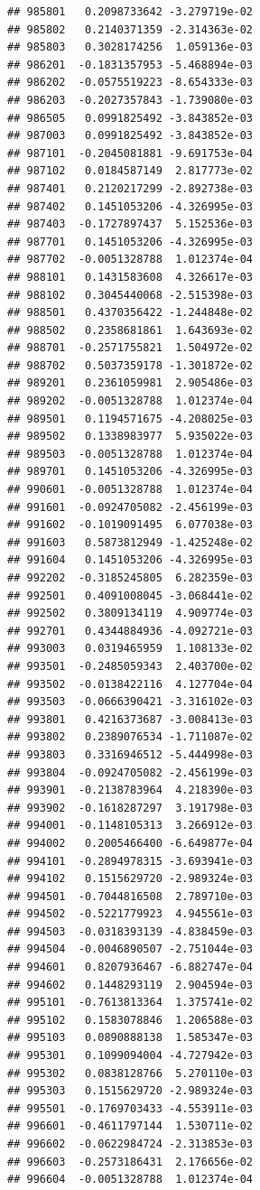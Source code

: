 \begin{frame}[fragile]
\begin{verbatim}
## 985801   0.2098733642 -3.279719e-02
## 985802   0.2140371359 -2.314363e-02
## 985803   0.3028174256  1.059136e-03
## 986201  -0.1831357953 -5.468894e-03
## 986202  -0.0575519223 -8.654333e-03
## 986203  -0.2027357843 -1.739080e-03
## 986505   0.0991825492 -3.843852e-03
## 987003   0.0991825492 -3.843852e-03
## 987101  -0.2045081881 -9.691753e-04
## 987102   0.0184587149  2.817773e-02
## 987401   0.2120217299 -2.892738e-03
## 987402   0.1451053206 -4.326995e-03
## 987403  -0.1727897437  5.152536e-03
## 987701   0.1451053206 -4.326995e-03
## 987702  -0.0051328788  1.012374e-04
## 988101   0.1431583608  4.326617e-03
## 988102   0.3045440068 -2.515398e-03
## 988501   0.4370356422 -1.244848e-02
## 988502   0.2358681861  1.643693e-02
## 988701  -0.2571755821  1.504972e-02
## 988702   0.5037359178 -1.301872e-02
## 989201   0.2361059981  2.905486e-03
## 989202  -0.0051328788  1.012374e-04
## 989501   0.1194571675 -4.208025e-03
## 989502   0.1338983977  5.935022e-03
## 989503  -0.0051328788  1.012374e-04
## 989701   0.1451053206 -4.326995e-03
## 990601  -0.0051328788  1.012374e-04
## 991601  -0.0924705082 -2.456199e-03
## 991602  -0.1019091495  6.077038e-03
## 991603   0.5873812949 -1.425248e-02
## 991604   0.1451053206 -4.326995e-03
## 992202  -0.3185245805  6.282359e-03
## 992501   0.4091008045 -3.068441e-02
## 992502   0.3809134119  4.909774e-03
## 992701   0.4344884936 -4.092721e-03
## 993003   0.0319465959  1.108133e-02
## 993501  -0.2485059343  2.403700e-02
## 993502  -0.0138422116  4.127704e-04
## 993503  -0.0666390421 -3.316102e-03
## 993801   0.4216373687 -3.008413e-03
## 993802   0.2389076534 -1.711087e-02
## 993803   0.3316946512 -5.444998e-03
## 993804  -0.0924705082 -2.456199e-03
## 993901  -0.2138783964  4.218390e-03
## 993902  -0.1618287297  3.191798e-03
## 994001  -0.1148105313  3.266912e-03
## 994002   0.2005466400 -6.649877e-04
## 994101  -0.2894978315 -3.693941e-03
## 994102   0.1515629720 -2.989324e-03
## 994501  -0.7044816508  2.789710e-03
## 994502  -0.5221779923  4.945561e-03
## 994503  -0.0318393139 -4.838459e-03
## 994504  -0.0046890507 -2.751044e-03
## 994601   0.8207936467 -6.882747e-04
## 994602   0.1448293119  2.904594e-03
## 995101  -0.7613813364  1.375741e-02
## 995102   0.1583078846  1.206588e-03
## 995103   0.0890888138  1.585347e-03
## 995301   0.1099094004 -4.727942e-03
## 995302   0.0838128766  5.270110e-03
## 995303   0.1515629720 -2.989324e-03
## 995501  -0.1769703433 -4.553911e-03
## 996601  -0.4611797144  1.530711e-02
## 996602  -0.0622984724 -2.313853e-03
## 996603  -0.2573186431  2.176656e-02
## 996604  -0.0051328788  1.012374e-04

\end{verbatim}
\end{frame}
